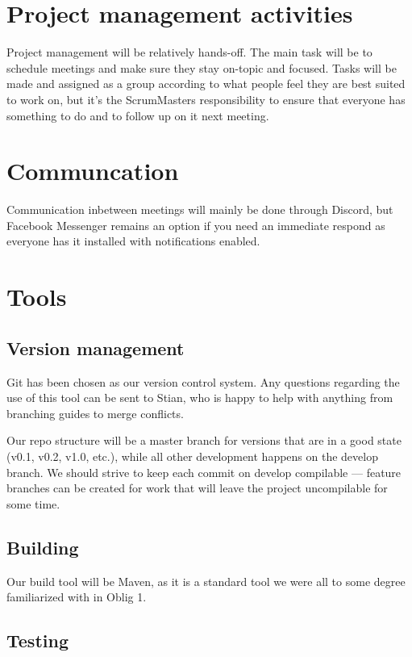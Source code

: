 \documentclass{article}
\begin{document}
\section*{Project management activities}

Project management will be relatively hands-off. The main task will be to schedule meetings and make sure they stay on-topic and focused. Tasks will be made and assigned as a group according to what people feel they are best suited to work on, but it's the ScrumMasters responsibility to ensure that everyone has something to do and to follow up on it next meeting.

\section*{Communcation}

Communication inbetween meetings will mainly be done through Discord, but Facebook Messenger remains an option if you need an immediate respond as everyone has it installed with notifications enabled. 

\section*{Tools}

\subsection*{Version management}

Git has been chosen as our version control system. Any questions regarding the use of this tool can be sent to Stian, who is happy to help with anything from branching guides to merge conflicts.

Our repo structure will be a master branch for versions that are in a good state (v0.1, v0.2, v1.0, etc.), while all other development happens on the develop branch. We should strive to keep each commit on develop compilable --- feature branches can be created for work that will leave the project uncompilable for some time.

\subsection*{Building}

Our build tool will be Maven, as it is a standard tool we were all to some degree familiarized with in Oblig 1.

\subsection*{Testing}
\end{document}
